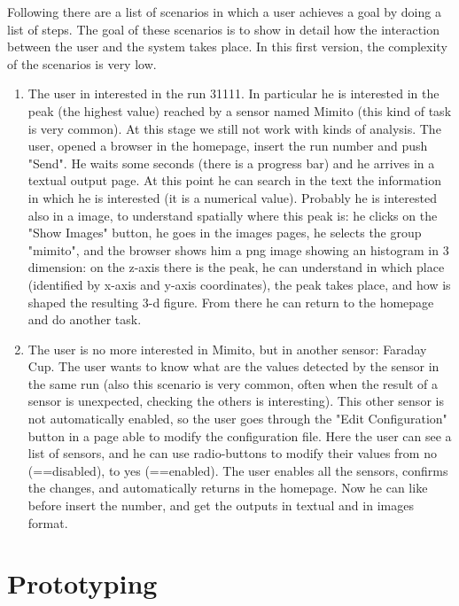 Following there are a list of scenarios in which a user achieves a goal by doing a list of steps. The goal of these scenarios is to show in detail how the interaction between the user and the system takes place. In this first version, the complexity of the scenarios is very low. 

\begin{enumerate}

\item The user in interested in the run 31111. In particular he is interested in the peak (the highest value) reached by a sensor named Mimito (this kind of task is very common). At this stage we still not work with kinds of analysis. The user, opened a browser in the homepage, insert the run number and push "Send". He waits some seconds (there is a progress bar) and he arrives in a textual output page. At this point he can search in the text the information in which he is interested (it is a numerical value). Probably he is interested also in a image, to understand spatially where this peak is: he clicks on the "Show Images" button, he goes in the images pages, he selects the group "mimito", and the browser shows him a png image showing an histogram in 3 dimension: on the z-axis there is the peak, he can understand in which place (identified by x-axis and y-axis coordinates), the peak takes place, and how is shaped the resulting 3-d figure. From there he can return to the homepage and do another task.   

\item The user is no more interested in Mimito, but in another sensor: Faraday Cup. The user wants to know what are the values detected by the sensor in the same run (also this scenario is very common, often when the result of a sensor is unexpected, checking the others is interesting). This other sensor is not automatically enabled, so the user goes through the "Edit Configuration" button in a page able to modify the configuration file. Here the user can see a list of sensors, and he can use radio-buttons to modify their values from no (==disabled), to yes (==enabled). The user enables all the sensors, confirms the changes, and automatically returns in the homepage. Now he can like before insert the number, and get the outputs in textual and in images format.  



\end{enumerate}


\section{Prototyping}

